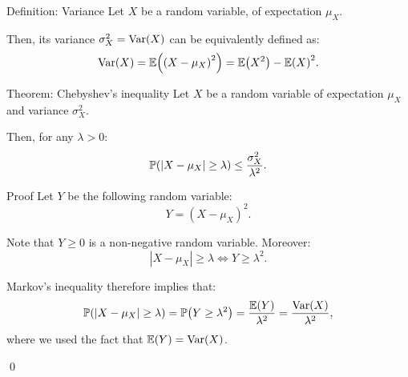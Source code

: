 \documentclass[a4paper]{article}
\begin{document}
\begin{parag}{Definition: Variance}
    Let $X$ be a random variable, of expectation $\mu_X$.

    Then, its variance $\sigma_X^2 = \Var\left(X\right)$ can be equivalently defined as: 
    \[\Var\left(X\right) = \exval\left(\left(X - \mu_X\right)^2\right) = \exval\left(X^2\right) - \exval\left(X\right)^2.\]
\end{parag}


\begin{parag}{Theorem: Chebyshev's inequality}
    Let $X$ be a random variable of expectation $\mu_X$ and variance $\sigma_X^2$.

    Then, for any $\lambda > 0$: 
    \[\prob\left(\left|X - \mu_X\right| \geq \lambda\right) \leq \frac{\sigma_X^2}{\lambda^2}.\]
    
    \begin{subparag}{Proof}
        Let $Y$ be the following random variable: 
        \[Y = \left(X - \mu_X\right)^2.\]

        Note that $Y \geq 0$ is a non-negative random variable. Moreover: 
        \[\left|X - \mu_X\right| \geq \lambda \iff Y \geq \lambda^2.\]
        
        Markov's inequality therefore implies that: 
        \[\prob\left(\left|X - \mu_X\right| \geq \lambda\right) = \prob\left(Y \geq \lambda^2\right) = \frac{\exval\left(Y\right)}{\lambda^2} = \frac{\Var \left(X\right)}{\lambda^2},\]
        where we used the fact that $\exval\left(Y\right) = \Var\left(X\right)$.

        \qed
    \end{subparag}
\end{parag}
\end{document}
